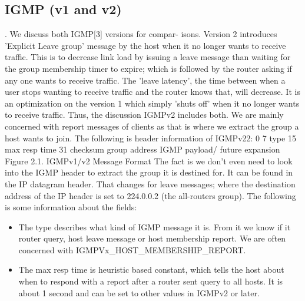 \documentclass[11pt,left=2cm,bottom=2cm,oneside]{book}
\begin{document}
\subsection{IGMP (v1 and v2)}. We discuss both IGMP[3] versions for compar-
isons. Version 2 introduces 'Explicit Leave group' message by the host when it
no longer wants to receive traffic. This is to decrease link load by issuing a
leave
message than waiting for the group membership timer to expire; which is
followed
by the router asking if any one wants to receive traffic. The 'leave latency',
the
time between when a user stops wanting to receive traffic and the router knows
that, will decrease. It is an optimization on the version 1 which simply
'shuts off'
when it no longer wants to receive traffic. Thus, the discussion IGMPv2
includes
both. We are mainly concerned with report messages of clients as that is where
we extract the group a host wants to join. The following is header information
of
IGMPv22:
0
7
type
15
max resp time
31
checksum
group address
IGMP payload/ future expansion
Figure 2.1. IGMPv1/v2 Message Format
The fact is we don't even need to look into the IGMP header to extract the group
it is destined for. It can be found in the IP datagram header. That changes
for
leave messages; where the destination address of the IP header is set to
224.0.0.2
(the all-routers group). The following is some information about the fields:
\begin{itemize}
\item The type describes what kind of IGMP message it is. From it we know
if it router query, host leave message or host membership report. We are
often concerned with IGMPV{x}\_HOST\_MEMBERSHIP\_REPORT.
\item The max resp time is heuristic based constant, which tells the host about
when to respond with a report after a router sent query to all hosts. It is
about 1 second and can be set to other values in IGMPv2 or later.
\end{itemize}
\end{document}
